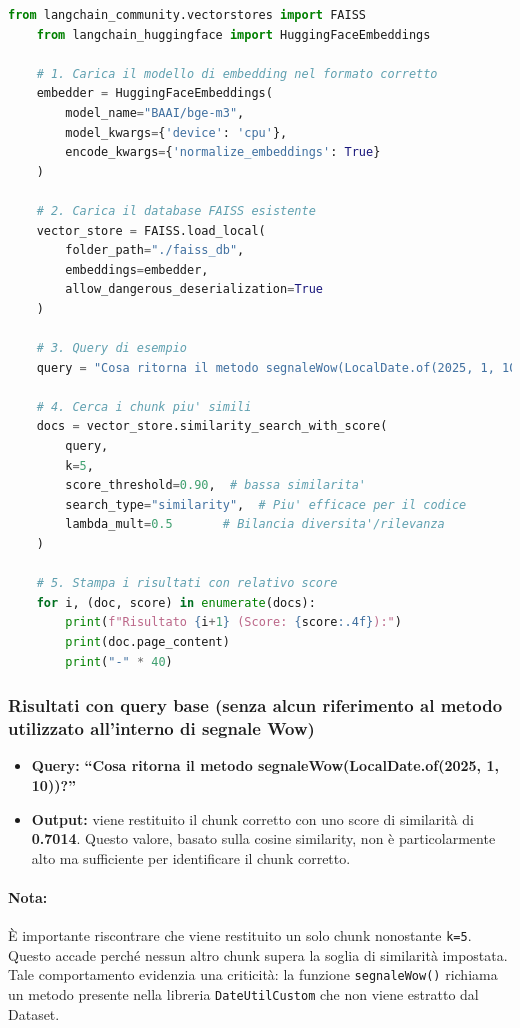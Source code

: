 \documentclass[12pt,a4paper,openright,twoside]{book}
\begin{document}
    \begin{lstlisting}[language=Python, caption={Esecuzione di una query sul database FAISS}, label={lst:query}]
    from langchain_community.vectorstores import FAISS
    from langchain_huggingface import HuggingFaceEmbeddings

    # 1. Carica il modello di embedding nel formato corretto
    embedder = HuggingFaceEmbeddings(
        model_name="BAAI/bge-m3",
        model_kwargs={'device': 'cpu'},
        encode_kwargs={'normalize_embeddings': True}
    )

    # 2. Carica il database FAISS esistente
    vector_store = FAISS.load_local(
        folder_path="./faiss_db",
        embeddings=embedder,
        allow_dangerous_deserialization=True
    )

    # 3. Query di esempio
    query = "Cosa ritorna il metodo segnaleWow(LocalDate.of(2025, 1, 10))?"

    # 4. Cerca i chunk piu' simili
    docs = vector_store.similarity_search_with_score(
        query,
        k=5,
        score_threshold=0.90,  # bassa similarita'
        search_type="similarity",  # Piu' efficace per il codice
        lambda_mult=0.5       # Bilancia diversita'/rilevanza
    )

    # 5. Stampa i risultati con relativo score
    for i, (doc, score) in enumerate(docs):
        print(f"Risultato {i+1} (Score: {score:.4f}):")
        print(doc.page_content)
        print("-" * 40)
    \end{lstlisting}

    \subsubsection{Risultati con query base (senza alcun riferimento al metodo utilizzato all'interno di segnale Wow)}
    \begin{itemize}
        \item \textbf{Query:} 
            \newline
                \textbf{``Cosa ritorna il metodo segnaleWow(LocalDate.of(2025, 1, 10))?''}
            \newline
        \item \textbf{Output:}
        viene restituito il chunk corretto con uno score di similarità di \textbf{0.7014}. Questo valore, basato sulla cosine similarity, non è particolarmente alto ma sufficiente per identificare il chunk corretto.
    \end{itemize}
    \paragraph{Nota:}
    È importante riscontrare che viene restituito un solo chunk nonostante \texttt{k=5}.
    Questo accade perché nessun altro chunk supera la soglia di similarità impostata.
    Tale comportamento evidenzia una criticità: la funzione \texttt{segnaleWow()} richiama un metodo presente nella libreria \texttt{DateUtilCustom} che non viene estratto dal Dataset.
\end{document}
